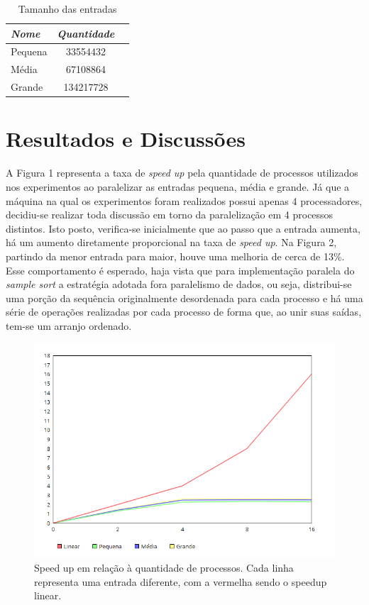 \documentclass[letterpaper, 10 pt, conference]{ieeeconf}  %
\begin{document}
{
\begin{table}[htbp]
\centering
\caption{Tamanho das entradas}
\begin{tabular}{lcc}
\hline
\textit{Nome} & \textit{Quantidade} \\ \hline
Pequena & 33554432 \\
Média & 67108864  \\
Grande & 134217728 \\ \hline
\end{tabular}
\label{table2}
\end{table}
}



\section{Resultados e Discussões}
A Figura 1 representa a taxa de \textit{speed up} pela quantidade de processos utilizados nos experimentos ao paralelizar as entradas pequena, média e grande. Já que a máquina na qual os experimentos foram realizados possui apenas 4 processadores, decidiu-se realizar toda discussão em torno da paralelização em 4 processos distintos. Isto posto, verifica-se inicialmente que ao passo que a entrada aumenta, há um aumento diretamente proporcional na taxa de \textit{speed up}. Na Figura 2, partindo da menor entrada para maior, houve uma melhoria de cerca de 13\%. Esse comportamento é esperado, haja vista que para implementação paralela do \textit{sample sort} a estratégia adotada fora paralelismo de dados, ou seja, distribui-se uma porção da sequência originalmente desordenada para cada processo e há uma série de operações realizadas por cada processo de forma que, ao unir suas saídas, tem-se um arranjo ordenado.
\begin{figure}[htbp]
      \centering
      \includegraphics[scale=0.35]{speedup_multi.png}
      \caption{ Speed up em relação à quantidade de processos. Cada linha representa uma entrada diferente, com a vermelha sendo o speedup linear. }
      \label{figurelabel1}
\end{figure}
\end{document}

